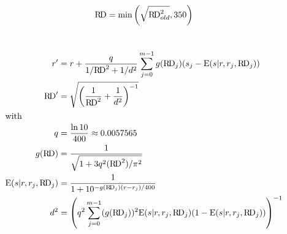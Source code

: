 \documentclass[a4paper,10pt]{scrartcl}
\title{}
\author{}
\newcommand{\hnS}{\hspace{-1.25pt}}
\newcommand{\RD}{\textnormal{R\hnS D}}
\newcommand{\E}{\textnormal{E}(s|r,r_j,\RD_j)}
\renewcommand{\min}[2]{\textnormal{min}\left(#1,#2\right)}
\begin{document}
\section{}
\begin{align}
 \RD = \min{\sqrt{\RD^{2}_{old}}}{350}
\end{align}

\section{}
\begin{align}
 r' &= r + \frac{q}{1/ \RD^2 + 1/ d^2} \sum_{j=0}^{m-1}g(\RD_j)(s_j - \E )\\
 \RD' &= \sqrt{\left(\frac{1}{\RD^2} + \frac{1}{d^2} \right)^{-1}}\\
 \intertext{with}
 q &= \frac{\ln{10}}{400} \approx 0.0057565 \\
 g(\RD) &= \frac{1}{\sqrt{1 + 3q^2(\RD^2)/\pi^2}} \\
 \E &=\frac{1}{1+ 10^{-g(\RD_j)(r-r_j)/400}} \\
 d^2 &= \left( q^2 \sum_{j=0}^{m-1}(g(\RD_j))^2\E(1-\E)\right)^{-1}
\end{align}
\end{document}
